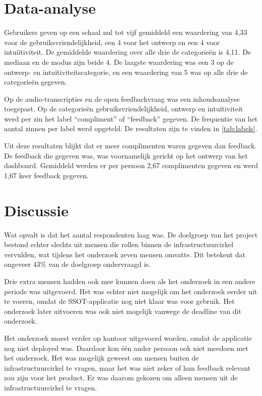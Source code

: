 \documentclass[a4paper, dutch]{article}
\begin{document}
\section{Data-analyse}

Gebruikers geven op een schaal nul tot vijf gemiddeld een waardering van 4,33 voor de gebruiksvriendelijkheid, een 4 voor het ontwerp en een 4 voor intuiïtiviteit. De gemiddelde waardering over alle drie de categorieën is 4,11. De mediaan en de modus zijn beide 4. De laagste waardering was een 3 op de ontwerp- en intuïtiviteitscategorie, en een waardering van 5 was op alle drie de categorieën gegeven.

Op de audio-transcripties en de open feedbackvraag was een inhoudsanalyse toegepast. Op de categorieën gebruiksvriendelijkheid, ontwerp en intuïti\-viteit werd per zin het label ``compliment'' of ``feedback'' gegeven. De frequentie van het aantal zinnen per label werd opgeteld. De resultaten zijn te vinden in \autoref{tab:labels}.



Uit deze resultaten blijkt dat er meer complimenten waren gegeven dan feedback. De feedback die gegeven was, was voornamelijk gericht op het ontwerp van het dashboard. Gemiddeld werden er per persoon 2,67 complimenten gegeven en werd 1,67 keer feedback gegeven.

\section{Discussie}

Wat opvalt is dat het aantal respondenten laag was. De doelgroep van het project bestond echter slechts uit mensen die rollen binnen de infrastructuurcirkel vervulden, wat tijdens het onderzoek zeven mensen omvatte. Dit betekent dat ongeveer 43\% van de doelgroep ondervraagd is.

Drie extra mensen hadden ook mee kunnen doen als het onderzoek in een andere periode was uitgevoerd. Het was echter niet mogelijk om het onderzoek eerder uit te voeren, omdat de SSOT-applicatie nog niet klaar was voor gebruik. Het onderzoek later uitvoeren was ook niet mogelijk vanwege de deadline van dit onderzoek.

Het onderzoek moest verder op kantoor uitgevoerd worden, omdat de applicatie nog niet deployed was. Daardoor kon één ander persoon ook niet meedoen met het onderzoek. Het was mogelijk geweest om mensen buiten de infrastructuurcirkel te vragen, maar het was niet zeker of hun feedback relevant zou zijn voor het product. Er was daarom gekozen om alleen mensen uit de infrastructuurcirkel te vragen.
\end{document}
